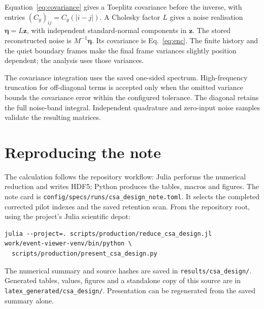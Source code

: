 \documentclass[11pt,a4paper]{article}
\begin{document}
Equation~\eqref{eq:covariance} gives a Toeplitz covariance before the inverse,
with entries $(C_y)_{ij}=C_y(|i-j|)$. A Cholesky factor $L$ gives a noise
realisation $\boldsymbol\eta=L\mathbf z$, with independent standard-normal
components in $\mathbf z$. The stored reconstructed noise is
$M^{-1}\boldsymbol\eta$. Its covariance is Eq.~\eqref{eq:enc}.
The finite history and the quiet boundary frames make the final frame
variances slightly position dependent; the analysis uses those variances.

The covariance integration uses the saved one-sided spectrum. High-frequency
truncation for off-diagonal terms is accepted only when the omitted variance
bounds the covariance error within the configured tolerance. The diagonal
retains the full noise-band integral. Independent quadrature and zero-input
noise samples validate the resulting matrices.

\section{Reproducing the note}

The calculation follows the repository workflow: Julia performs the numerical
reduction and writes HDF5; Python produces the tables, macros and figures.
The note card is \texttt{config/specs/runs/csa\_design\_note.toml}.
It selects the completed corrected pilot indexes and the saved retention scan.
From the repository root, using the project's Julia scientific depot:
\begin{verbatim}
julia --project=. scripts/production/reduce_csa_design.jl
work/event-viewer-venv/bin/python \
  scripts/production/present_csa_design.py
\end{verbatim}
The numerical summary and source hashes are saved in
\texttt{results/csa\_design/}. Generated tables, values, figures and a standalone
copy of this source are in \texttt{latex\_generated/csa\_design/}.
Presentation can be regenerated from the saved summary alone.
\end{document}
